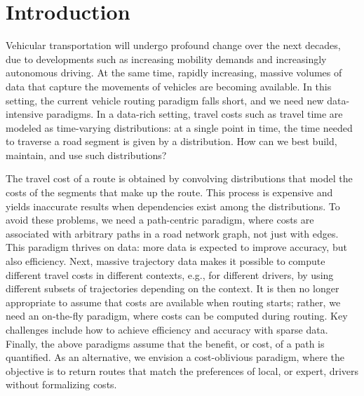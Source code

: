 \documentclass[11pt]{article}
\begin{document}






\section{Introduction}

Vehicular transportation will undergo profound change over the next decades, due to developments such as increasing mobility demands and increasingly autonomous driving. At the same time, rapidly increasing, massive volumes of data that capture the movements of vehicles are becoming available. In this setting, the current vehicle routing paradigm falls short, and we need new data-intensive paradigms. In a data-rich setting, travel costs such as travel time are modeled as time-varying distributions: at a single point in time, the time needed to traverse a road segment is given by a distribution. How can we best build, maintain, and use such distributions? 

The travel cost of a route is obtained by convolving distributions that model the costs of the segments that make up the route. This process is expensive and yields inaccurate results when dependencies exist among the distributions. To avoid these problems, we need a path-centric paradigm, where costs are associated with arbitrary paths in a road network graph, not just with edges. This paradigm thrives on data: more data is expected to improve accuracy, but also efficiency. Next, massive trajectory data makes it possible to compute different travel costs in different contexts, e.g., for different drivers, by using different subsets of trajectories depending on the context. It is then no longer appropriate to assume that costs are available when routing starts; rather, we need an on-the-fly paradigm, where costs can be computed during routing. Key challenges include how to achieve efficiency and accuracy with sparse data. Finally, the above paradigms assume that the benefit, or cost, of a path is quantified. As an alternative, we envision a cost-oblivious paradigm, where the objective is to return routes that match the preferences of local, or expert, drivers without formalizing costs.
\end{document}
